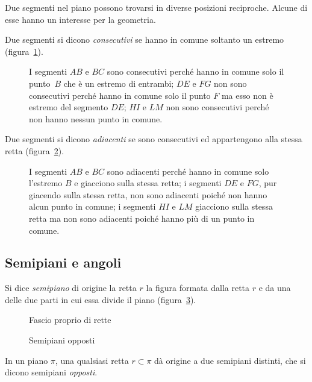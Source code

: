 Due segmenti nel piano possono trovarsi in diverse posizioni reciproche. Alcune di esse hanno un interesse per la geometria.
\begin{definizione}
Due segmenti si dicono \emph{consecutivi} se hanno in comune soltanto un estremo (figura~\ref{fig:1.14}).
\end{definizione}
\begin{figure}[bth]
 \centering 
 \caption{I segmenti $AB$ e $BC$ sono consecutivi perché hanno in comune solo il punto~$B$ che è un estremo di entrambi; $DE$ e $FG$ non sono consecutivi perché hanno in comune solo il punto $F$ ma esso non è estremo del segmento $DE$; $HI$ e $LM$ non sono consecutivi perché non hanno nessun punto in comune.}\label{fig:1.14}
\end{figure}

\begin{definizione}
Due segmenti si dicono \emph{adiacenti} se sono consecutivi ed appartengono alla stessa retta (figura~\ref{fig:1.15}).
\end{definizione}
\begin{figure}[tbh]
 \centering 
 \caption{I segmenti $AB$ e $BC$ sono adiacenti perché hanno in comune solo l'estremo $B$ e giacciono sulla stessa retta; i segmenti $DE$ e $FG$, pur giacendo sulla stessa retta, non sono adiacenti poiché non hanno alcun punto in comune; i segmenti $HI$ e $LM$ giacciono sulla stessa retta ma non sono adiacenti poiché hanno più di un punto in comune.}\label{fig:1.15}
\end{figure}

\subsection{Semipiani e angoli}

\begin{definizione}
Si dice \emph{semipiano} di origine la retta $r$ la figura formata dalla retta $r$ e da una delle due parti in cui essa divide il piano (figura~\ref{fig:1.17}).
\end{definizione}
\begin{figure}[b,t,h]
 \begin{minipage}[b]{.40\textwidth}
 \centering
 \caption{Fascio proprio di rette}\label{fig:1.16}
 \end{minipage}\hfil
 \begin{minipage}[b]{.40\textwidth}
 \centering
  \caption{Semipiani opposti}\label{fig:1.17}
  \end{minipage}
\end{figure}
In un piano ${\pi}$, una qualsiasi retta $r \subset \pi$ dà origine a due semipiani distinti, che si dicono semipiani \emph{opposti}.

